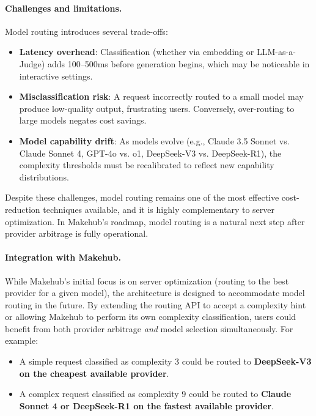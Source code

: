 \documentclass[english]{article}
\begin{document}
\paragraph{Challenges and limitations.}

Model routing introduces several trade-offs:
\begin{itemize}
    \item \textbf{Latency overhead}: Classification (whether via embedding or LLM-as-a-Judge) adds 100--500ms before generation begins, which may be noticeable in interactive settings.
    \item \textbf{Misclassification risk}: A request incorrectly routed to a small model may produce low-quality output, frustrating users. Conversely, over-routing to large models negates cost savings.
    \item \textbf{Model capability drift}: As models evolve (e.g., Claude 3.5 Sonnet vs. Claude Sonnet 4, GPT-4o vs. o1, DeepSeek-V3 vs. DeepSeek-R1), the complexity thresholds must be recalibrated to reflect new capability distributions.
\end{itemize}

Despite these challenges, model routing remains one of the most effective cost-reduction techniques available, and it is highly complementary to server optimization. In Makehub's roadmap, model routing is a natural next step after provider arbitrage is fully operational.

\paragraph{Integration with Makehub.}

While Makehub's initial focus is on server optimization (routing to the best provider for a given model), the architecture is designed to accommodate model routing in the future. By extending the routing API to accept a complexity hint or allowing Makehub to perform its own complexity classification, users could benefit from both provider arbitrage \emph{and} model selection simultaneously. For example:
\begin{itemize}
    \item A simple request classified as complexity 3 could be routed to \textbf{DeepSeek-V3 on the cheapest available provider}.
    \item A complex request classified as complexity 9 could be routed to \textbf{Claude Sonnet 4 or DeepSeek-R1 on the fastest available provider}.
\end{itemize}
\end{document}
